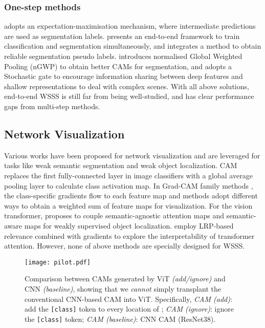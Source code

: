 \documentclass[10pt,twocolumn,letterpaper]{article}
\begin{document}
\subsubsection{One-step methods}
\cite{papandreou2015weakly} adopts an expectation-maximisation mechanism, where intermediate predictions are used as segmentation labels.
\cite{zhang2020reliability} presents an
end-to-end framework to train classification and segmentation simultaneously, and integrates a method to obtain reliable segmentation pseudo labels.
\cite{Araslanov_2020_CVPR} introduces normalised Global Weighted Pooling (nGWP) to obtain better CAMs for segmentation, and adopts a Stochastic gate to encourage information sharing between deep features and shallow representations to deal with complex scenes.
With all above solutions, end-to-end WSSS is still far from being well-studied, and has clear performance gaps from multi-step methods. 


\subsection{Network Visualization}
Various works have been proposed for network visualization and are leveraged for tasks like weak semantic segmentation and weak object localization.
CAM \cite{zhou2016learning} replaces the first fully-connected layer in image classifiers with a global average pooling layer to calculate class activation map.
In Grad-CAM family methods \cite{selvaraju2016grad,jiang2021layercam,chattopadhay2018grad}, the class-specific gradients flow to each feature map and methods adopt different ways to obtain a weighted sum of feature maps for visualization.
For the vision transformer, \cite{gao2021tscam} proposes to couple semantic-agnostic attention maps and semantic-aware maps for weakly supervised object localization.
\cite{chefer2021transformer,chefer2021generic} employ LRP-based relevance \cite{bach2015pixel} combined with gradients to explore the interpretability of transformer attention. However, none of above methods are specially designed for WSSS.



\begin{figure}[!t]
   \begin{center}
   {\texttt{[image: pilot.pdf]}} 
   \end{center}
    \caption{Comparison between CAMs generated by ViT \textit{(add/ignore)} and CNN \textit{(baseline)},
    showing that we \textit{cannot} simply transplant the conventional CNN-based CAM into ViT.
    Specifically,
    \textit{CAM (add)}: add the \texttt{[class]} token  to every location of  ;
    \textit{CAM (ignore)}: ignore the \texttt{[class]} token; 
\textit{CAM (baseline)}: CNN CAM (ResNet38).
    }
\label{fig:pilot}
\end{figure}
\end{document}
